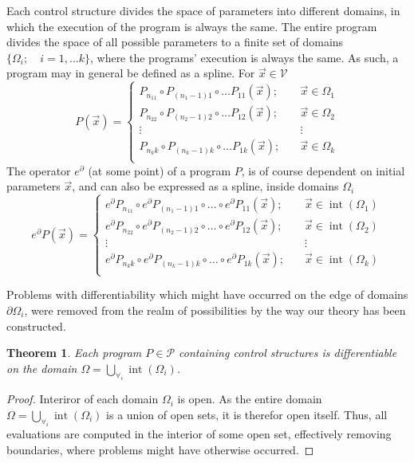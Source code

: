 \documentclass{article}
\newcommand{\VV}{\mathcal{V}}
\newcommand{\dP}{\mathcal{P}}
\newcommand{\D}{\partial}
\DeclareMathOperator{\interior}{int}
\newtheorem{izrek}{Theorem}[section]
\begin{document}
 Each control structure divides the space of parameters into different domains, in which the execution of the program is always the same. The entire program divides the space of all possible parameters to a finite set of domains $\{\Omega_i;\quad i=1,\ldots
  k\}$, where the programs' execution is always the same. As such, a program may in general be defined as a spline. For $\vec{x}\in\VV$
 \begin{equation}
   \label{eq:zlrprk_splosno}
   P(\vec{x}) =
   \begin{cases}
     P_{n_11}\circ P_{(n_1-1)1}\circ\ldots P_{11}(\vec{x});&\quad \vec{x}\in\Omega_1\\
     P_{n_22}\circ P_{(n_2-1)2}\circ\ldots P_{12}(\vec{x});&\quad \vec{x}\in\Omega_2\\
     \vdots&\quad\vdots\\
     P_{n_kk}\circ P_{(n_k-1)k}\circ\ldots P_{1k}(\vec{x});&\quad \vec{x}\in\Omega_k\\
   \end{cases}
 \end{equation}
 The operator $e^\D$ (at some point) of a program $P$, is of course dependent on initial parameters $\vec{x}$, and can also be expressed as a spline, inside domains $\Omega_i$
 \begin{equation}
   \label{eq:Dzlrprk_splosno}
   e^\D P({\vec{x}}) =
   \begin{cases}
     e^\D P_{n_11}\circ e^\D P_{(n_1-1)1}\circ\ldots\circ e^\D P_{11}(\vec{x});&\quad \vec{x}\in\interior(\Omega_1)\\
     e^\D P_{n_22}\circ e^\D P_{(n_2-1)2}\circ\ldots\circ e^\D P_{12}(\vec{x});&\quad \vec{x}\in\interior(\Omega_2)\\
     \vdots&\quad\vdots\\
     e^\D P_{n_kk}\circ e^\D P_{(n_k-1)k}\circ\ldots\circ e^\D P_{1k}(\vec{x});&\quad \vec{x}\in\interior(\Omega_k)\\
   \end{cases}
 \end{equation}

 Problems with differentiability which might have occurred on the edge of domains $\partial\Omega_i$, were removed from the realm of possibilities by the way our theory has been constructed.


 \begin{izrek}\label{izr:diferentiableOnDomain}
 Each program $P\in\dP$ containing control structures is differentiable on the domain $\Omega=\bigcup\limits_{\forall_i}\interior(\Omega_i)$.
 \end{izrek}
 \begin{proof}
  Interiror of each domain $\Omega_i$ is open. As the entire domain $\Omega=\bigcup\limits_{\forall_i}\interior(\Omega_i)$ is a union of open sets, it is therefor open itself. Thus, all evaluations are computed in the interior of some open set, effectively removing boundaries, where problems might have otherwise occurred.
 \end{proof}
 
\end{document}

